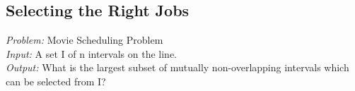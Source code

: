 \subsection{Selecting the Right Jobs}


\emph{Problem:} Movie Scheduling Problem \\
\emph{Input:} A set I of n intervals on the line. \\
\emph{Output:} What is the largest subset of mutually non-overlapping intervals which can be selected from I?\\

\noindent{}